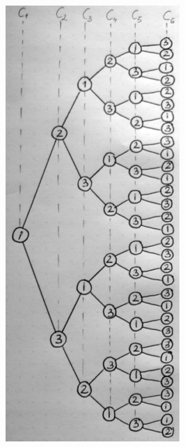         \begin{figure}
            \includegraphics[width=1\linewidth]{baum_kreativ}
        \end{figure}\\
